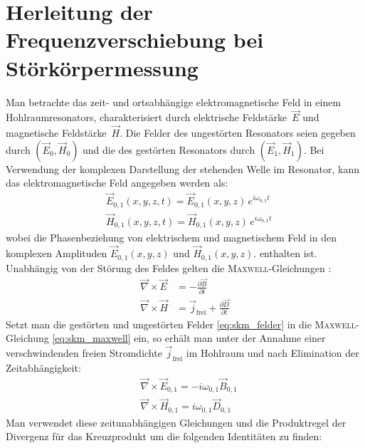 \documentclass[11pt, a4paper]{scrbook}
\newcommand{\vnabla}{\vec{\nabla}}
\newcommand{\ve}{\vec{E}}
\newcommand{\vb}{\vec{B}}
\newcommand{\vh}{\vec{H}}
\newcommand{\vd}{\vec{D}}
\begin{document}
	\chapter{Herleitung der Frequenzverschiebung bei Störkörpermessung}
	\label{app:herleitung_frequenzverschiebung}
	Man betrachte das zeit- und ortsabhängige elektromagnetische Feld in einem Hohlraumresonators, charakterisiert durch elektrische Feldstärke~$\ve$ und magnetische Feldstärke~$\vh$.
	Die Felder des ungestörten Resonators seien gegeben durch $(\ve_0, \vh_0)$ und die des gestörten Resonators durch $(\ve_1, \vh_1)$.
	Bei Verwendung der komplexen Darstellung der stehenden Welle im Resonator, kann das elektromagnetische Feld angegeben werden als:
	\begin{subequations}
		\label{eq:skm_felder}
		\begin{align}
		&\ve_{0,1}(x,y,z,t) = \ve_{0,1}(x,y,z) \, e^{i \omega_{0,1} t}\\
		&\vh_{0,1}(x,y,z,t) = \vh_{0,1}(x,y,z) \, e^{i \omega_{0,1} t}
		\end{align}
	\end{subequations}
	wobei die Phasenbeziehung von elektrischem und magnetischem Feld in den komplexen Amplituden $\ve_{0,1}(x,y,z)$ und $\vh_{0,1}(x,y,z)$. enthalten ist.
	Unabhängig von der Störung des Feldes gelten die \textsc{Maxwell}-Gleichungen \cite{jackson}:
	\begin{subequations}
		\label{eq:skm_maxwell}
		\begin{align}
			\vnabla \times \ve &= - \frac{\partial \vb}{\partial t}\\
			\vnabla \times \vh &= \vec{j}_\mathrm{frei} + \frac{\partial \vd}{\partial t}
		\end{align}
	\end{subequations}
	Setzt man die gestörten und ungestörten Felder \eqref{eq:skm_felder} in die \textsc{Maxwell}-Gleichung \eqref{eq:skm_maxwell} ein, so erhält man unter der Annahme einer verschwindenden freien Stromdichte $\vec{j}_\mathrm{frei}$ im Hohlraum und nach Elimination der Zeitabhängigkeit:
	\begin{subequations}
		\label{eq:skm_zeitunabhaengig}
		\begin{align}
			&\vnabla \times \ve_{0,1} = - i \omega_{0,1} \vb_{0,1} \\
			&\vnabla \times \vh_{0,1} = i \omega_{0,1} \vd_{0,1}
		\end{align}
	\end{subequations}
	Man verwendet diese zeitunabhängigen Gleichungen und die Produktregel der Divergenz für das Kreuzprodukt um die folgenden Identitäten zu finden:
\end{document}
